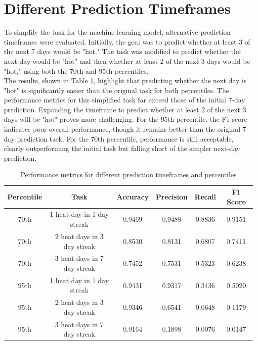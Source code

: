 \documentclass[8pt,a4paper]{article}
\begin{document}
\section{Different Prediction Timeframes}
To simplify the task for the machine learning model, alternative prediction timeframes were evaluated. Initially, the goal was to predict whether at least 3 of the next 7 days would be "hot." The task was modified to predict whether the next day would be "hot" and then whether at least 2 of the next 3 days would be "hot," using both the 70th and 95th percentiles. \\
The results, shown in Table \ref{tab:timeframe}, highlight that predicting whether the next day is "hot" is significantly easier than the original task for both percentiles. The performance metrics for this simplified task far exceed those of the initial 7-day prediction. Expanding the timeframe to predict whether at least 2 of the next 3 days will be "hot" proves more challenging. For the 95th percentile, the F1 score indicates poor overall performance, though it remains better than the original 7-day prediction task. For the 70th percentile, performance is still acceptable, clearly outperforming the initial task but falling short of the simpler next-day prediction.
\begin{table}[H]
    \centering
    \caption{Performance metrics for different prediction timeframes and percentiles}
    \label{tab:timeframe}
    \begin{tabular}{|c|c|c|c|c|c|}
        \hline
        \textbf{Percentile} & \textbf{Task} & \textbf{Accuracy} & \textbf{Precision} & \textbf{Recall} & \textbf{F1 Score} \\
        \hline
        70th & 1 heat day in 1 day streak & 0.9469 & 0.9488 & 0.8836 & 0.9151 \\
        70th & 2 heat days in 3 day streak & 0.8530 & 0.8131 & 0.6807 & 0.7411 \\
        70th & 3 heat days in 7 day streak & 0.7452 & 0.7531 & 0.5323 & 0.6238 \\
        \hline
        95th & 1 heat day in 1 day streak & 0.9431 & 0.9317 & 0.3436 & 0.5020 \\
        95th & 2 heat days in 3 day streak & 0.9346 & 0.6541 & 0.0648 & 0.1179 \\
        95th & 3 heat days in 7 day streak & 0.9164 & 0.1898 & 0.0076 & 0.0147 \\
        \hline
    \end{tabular}
\end{table}
\end{document}
